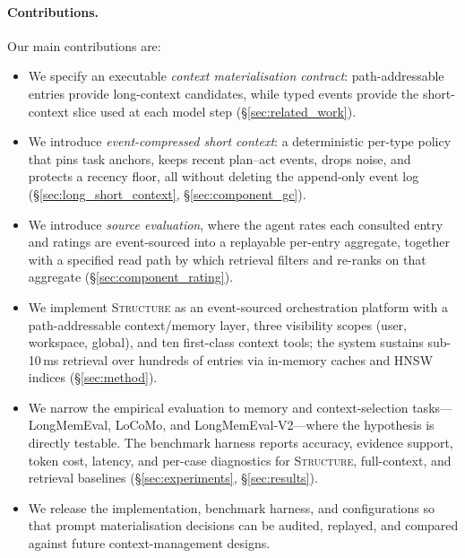 \paragraph{Contributions.} Our main contributions are:
\begin{itemize}
    \item We specify an executable \emph{context materialisation
    contract}: path-addressable entries provide long-context candidates,
    while typed events provide the short-context slice used at each
    model step (\S\ref{sec:related_work}).
    \item We introduce \emph{event-compressed short context}: a
    deterministic per-type policy that pins task anchors, keeps recent
    plan--act events, drops noise, and protects a recency floor, all
    without deleting the append-only event log
    (\S\ref{sec:long_short_context}, \S\ref{sec:component_gc}).
    \item We introduce \emph{source evaluation}, where the agent rates
    each consulted entry and ratings are event-sourced into a
    replayable per-entry aggregate, together with a specified read
    path by which retrieval filters and re-ranks on that aggregate
    (\S\ref{sec:component_rating}).
    \item We implement \textsc{Structure} as an event-sourced
    orchestration platform with a path-addressable context/memory layer,
    three visibility scopes (user, workspace, global), and ten
    first-class context tools; the system sustains sub-10\,ms retrieval over
    hundreds of entries via in-memory caches and HNSW indices
    (\S\ref{sec:method}).
    \item We narrow the empirical evaluation to memory and
    context-selection tasks---LongMemEval, LoCoMo, and
    LongMemEval-V2---where the hypothesis is directly testable. The
    benchmark harness reports accuracy, evidence support, token cost,
    latency, and per-case diagnostics for \textsc{Structure},
    full-context, and retrieval baselines
    (\S\ref{sec:experiments}, \S\ref{sec:results}).
    \item We release the implementation, benchmark harness, and
    configurations so that prompt materialisation decisions can be
    audited, replayed, and compared against future context-management
    designs.
\end{itemize}
